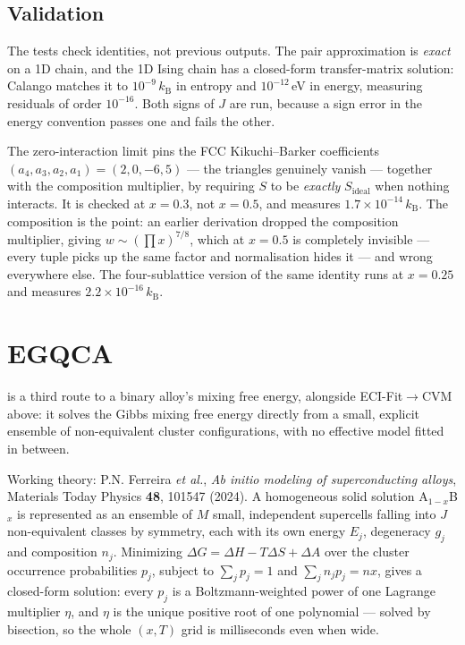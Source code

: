 \subsection{Validation}

The tests check identities, not previous outputs. The pair approximation is
\emph{exact} on a 1D chain, and the 1D Ising chain has a closed-form
transfer-matrix solution: Calango matches it to $10^{-9}\,k_\mathrm{B}$ in
entropy and $10^{-12}$\,eV in energy, measuring residuals of order $10^{-16}$.
Both signs of $J$ are run, because a sign error in the energy convention passes
one and fails the other.

The zero-interaction limit pins the FCC Kikuchi--Barker coefficients
$(a_4, a_3, a_2, a_1) = (2, 0, -6, 5)$ --- the triangles genuinely vanish ---
together with the composition multiplier, by requiring $S$ to be \emph{exactly}
$S_\mathrm{ideal}$ when nothing interacts. It is checked at $x = 0.3$, not
$x = 0.5$, and measures $1.7\times10^{-14}\,k_\mathrm{B}$. The composition is
the point: an earlier derivation dropped the composition multiplier, giving
$w \sim (\prod x)^{7/8}$, which at $x = 0.5$ is completely invisible --- every
tuple picks up the same factor and normalisation hides it --- and wrong
everywhere else. The four-sublattice version of the same identity runs at
$x = 0.25$ and measures $2.2\times10^{-16}\,k_\mathrm{B}$.

\section{EGQCA}
\label{sec:egqca}

\menusep{}\menusep{} is a third route to a binary alloy's mixing free
energy, alongside ECI-Fit$\to$CVM above: it solves the Gibbs mixing free
energy directly from a small, explicit ensemble of non-equivalent cluster
configurations, with no effective model fitted in between.

Working theory: P.N. Ferreira \emph{et al.}, \emph{Ab initio modeling of
superconducting alloys}, Materials Today Physics \textbf{48}, 101547
(2024). A homogeneous solid solution A$_{1-x}$B$_x$ is represented as an
ensemble of $M$ small, independent supercells falling into $J$
non-equivalent classes by symmetry, each with its own energy $E_j$,
degeneracy $g_j$ and composition $n_j$. Minimizing
$\Delta G = \Delta H - T\Delta S + \Delta A$ over the cluster occurrence
probabilities $p_j$, subject to $\sum_j p_j = 1$ and $\sum_j n_j p_j = nx$,
gives a closed-form solution: every $p_j$ is a Boltzmann-weighted power of
one Lagrange multiplier $\eta$, and $\eta$ is the unique positive root of
one polynomial --- solved by bisection, so the whole $(x, T)$ grid is
milliseconds even when wide.

